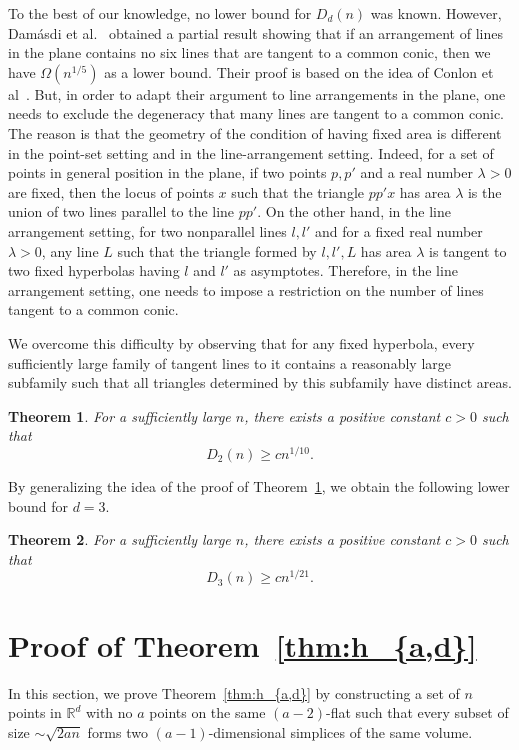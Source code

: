 \documentclass[a4paper,oneside,10pt]{amsart}
\newtheorem{thm}{Theorem}
\begin{document}
To the best of our knowledge, no lower bound for $D_d (n)$ was known. However, Dam\'{a}sdi et al.~\cite{damasdi2020triangle} obtained a partial result showing that if an arrangement of lines in the plane contains no six lines that are tangent to a common conic, then we have $\Omega (n^{1/5})$ as a lower bound.
Their proof is based on the idea of Conlon et al~\cite{conlon2015distinct}. But, in order to adapt their argument to line arrangements in the plane, one needs to exclude the degeneracy that many lines are tangent to a common conic.
The reason is that the geometry of the condition of having fixed area is different in the point-set setting and in the line-arrangement setting. Indeed, for a set of points in general position in the plane, if two points $p,p'$ and a real number $\lambda>0$ are fixed, then the locus of points $x$ such that the triangle $pp'x$ has area $\lambda$ is the union of two lines parallel to the line $pp'$.
On the other hand, in the line arrangement setting, for two nonparallel lines $l,l'$ and for a fixed real number $\lambda>0$, any line $L$ such that the triangle formed by $l,l',L$ has area $\lambda$ is tangent to two fixed hyperbolas having $l$ and $l'$ as asymptotes. Therefore, in the line arrangement setting, one needs to impose a restriction on the number of lines tangent to a common conic.

We overcome this difficulty by observing that for any fixed hyperbola,
every sufficiently large family of tangent lines to it contains a reasonably
large subfamily such that all triangles determined by this subfamily have
distinct areas.

\begin{thm}\label{thm:D_2}
For a sufficiently large $n$, there exists a positive constant $c>0$ such that 
$$
D_2 (n) \geq c n^{1/10}.
$$
\end{thm}


By generalizing the idea of the proof of Theorem~\ref{thm:D_2}, we obtain the following lower bound for $d=3$.

\begin{thm}\label{thm:betterboundforD_3}
For a sufficiently large $n$, there exists a positive constant $c > 0$ such that 
$$
D_3 (n) \geq c n^{1/21}.
$$
\end{thm}

\section{Proof of Theorem~\ref{thm:h_{a,d}}}
In this section, we prove Theorem~\ref{thm:h_{a,d}} by constructing a set of $n$ points in $\mathbb{R}^d$ with no $a$ points on the same $(a-2)$-flat such that every subset of size $\sim \sqrt{2an}$ forms two $(a-1)$-dimensional simplices of the same volume.
\end{document}
